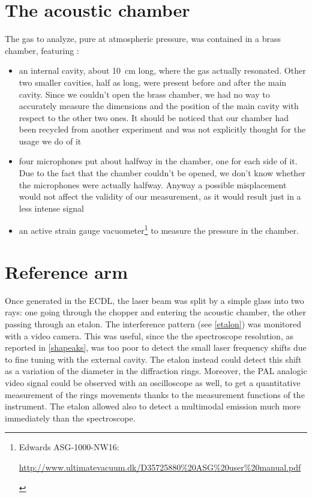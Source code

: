 \section{The acoustic chamber} 
 The gas to analyze, pure  at atmospheric pressure, was contained in a brass chamber, featuring :
\begin{itemize}
	\item an internal cavity, about \mbox{10 cm} long, where the gas actually resonated. Other two smaller cavities, half as long, were present before and after the main cavity. Since we couldn't open the brass chamber, we had no way to accurately measure the dimensions and the position of the main cavity with respect to the other two ones. It should be noticed that our chamber had been recycled from another experiment and was not explicitly thought for the usage we do of it
	\item four microphones put about halfway in the chamber, one for each side of it. Due to the fact that the chamber couldn't be opened, we don't know whether the microphones were actually halfway. Anyway a possible misplacement would not affect the validity of our measurement, as it would result just in a less intense signal
	\item an active strain gauge vacuometer\footnote{Edwards ASG-1000-NW16:\vspace{-10pt}\begin{flushright}\url{http://www.ultimatevacuum.dk/D35725880\%20ASG\%20user\%20manual.pdf }\end{flushright}} to measure the pressure in the chamber. 
\end{itemize}

\section{Reference arm}\label{referencearm}
Once generated in the ECDL, the laser beam was split by a simple glass into two rays: one going through the chopper and entering the acoustic chamber, the other passing  through an etalon. The interference pattern (see \cref{etalon}) was monitored with a video camera. This was useful, since the the spectroscope resolution, as reported in \cref{shapeaks}, was too poor to detect the small laser frequency shifts due to fine tuning with the external cavity. The etalon instead could detect this shift as a variation of the diameter in the diffraction rings. Moreover, the PAL analogic video signal could be observed with an oscilloscope as well, to get a quantitative measurement of the rings movements thanks to the measurement functions of the instrument. The etalon allowed also to detect a multimodal emission much more immediately than the spectroscope.